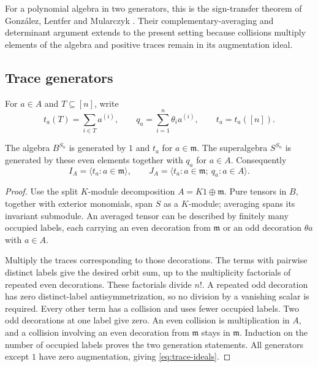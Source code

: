 For a polynomial algebra in two generators, this is the
sign-transfer theorem of Gonz\'alez, Lentfer and Mularczyk
\cite[Theorem~4.21]{GLM}.  Their complementary-averaging and
determinant argument \cite[Lemmas~4.13--4.15]{GLM} extends to the
present setting because collisions multiply elements of the
algebra and positive traces remain in its augmentation ideal.

\subsection{Trace generators}

For $a\in A$ and $T\subseteq[n]$, write
\[
 t_a(T)=\sum_{i\in T}a^{(i)},\qquad
 q_a=\sum_{i=1}^n\theta_i a^{(i)},\qquad
 t_a=t_a([n]).
\]

\begin{lemma}\label{lem:trace-generation}
The algebra $B^{S_n}$ is generated by $1$ and $t_a$
for $a\in\mathfrak m$.
The superalgebra $S^{S_n}$ is generated by these even
elements together with $q_a$ for $a\in A$.
Consequently
\begin{equation}\label{eq:trace-ideals}
 I_A=\langle t_a:a\in\mathfrak m\rangle,\qquad
 J_A=\langle t_a:a\in\mathfrak m;\
                    q_a:a\in A\rangle.
\end{equation}
\end{lemma}

\begin{proof}
Use the split $K$-module decomposition $A=K1\oplus\mathfrak m$.
Pure tensors in $B$, together with exterior monomials,
span $S$ as a $K$-module; averaging spans its invariant submodule.
An averaged tensor can be described by finitely many
occupied labels, each carrying an even decoration from
$\mathfrak m$ or an odd decoration $\theta a$ with
$a\in A$.

Multiply the traces corresponding to those decorations.
The terms with pairwise distinct labels give the desired
orbit sum, up to the multiplicity factorials of repeated
even decorations.  These factorials divide $n!$.
A repeated odd decoration has zero distinct-label
antisymmetrization, so no division by a vanishing scalar
is required.  Every other term has a collision and uses
fewer occupied labels.  Two odd decorations at one label
give zero.  An even collision is multiplication in $A$,
and a collision involving an even decoration from
$\mathfrak m$ stays in $\mathfrak m$.
Induction on the number of occupied labels proves the
two generation statements.  All generators except $1$
have zero augmentation, giving \eqref{eq:trace-ideals}.
\end{proof}

